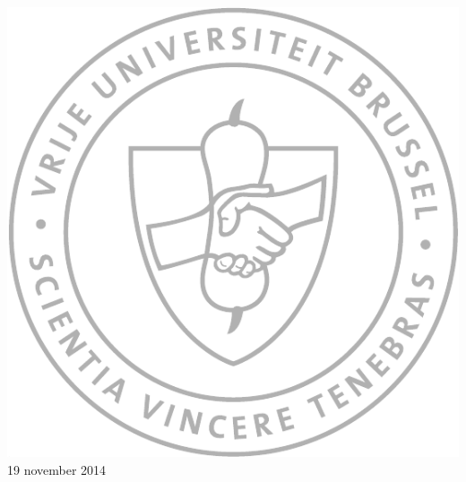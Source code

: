 \begin{titlepage}
\vspace{0.6cm}

\includegraphics[scale=0.4]{VUB_schild.pdf}\\[0.5cm]

{\large 19 november 2014}
\vfill %

\end{titlepage}